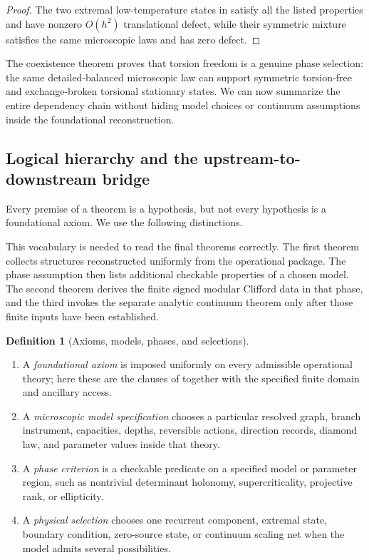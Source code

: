 \documentclass[11pt]{article}
\theoremstyle{definition}
\newtheorem{definition}[theorem]{Definition}
\theoremstyle{remark}
\begin{document}
\begin{proof}
The two extremal low-temperature states in
 satisfy all the listed properties and have
nonzero $O(h^2)$ translational defect, while their symmetric mixture satisfies
the same microscopic laws and has zero defect.
\end{proof}

The coexistence theorem proves that torsion freedom is a genuine phase selection:
the same detailed-balanced microscopic law can support symmetric torsion-free and
exchange-broken torsional stationary states.  We can now summarize the entire
dependency chain without hiding model choices or continuum assumptions inside the
foundational reconstruction.

\subsection{Logical hierarchy and the upstream-to-downstream bridge}
\label{subsec:logical-hierarchy}

Every premise of a theorem is a hypothesis, but not every hypothesis is a
foundational axiom.  We use the following distinctions.

This vocabulary is needed to read the final theorems correctly.  The first theorem
collects structures reconstructed uniformly from the operational package.  The
phase assumption then lists additional checkable properties of a chosen model.
The second theorem derives the finite signed modular Clifford data in that phase,
and the third invokes the separate analytic continuum theorem only after those
finite inputs have been established.

\begin{definition}[Axioms, models, phases, and selections]
\label{def:logical-roles}
\begin{enumerate}[label=\textup{(\roman*)},leftmargin=2.4em]
\item A \emph{foundational axiom} is imposed uniformly on every admissible
      operational theory; here these are the clauses of
       together with the specified finite
      domain and ancillary access.
\item A \emph{microscopic model specification} chooses a particular resolved
      graph, branch instrument, capacities, depths, reversible actions,
      direction records, diamond law, and parameter values inside that theory.
\item A \emph{phase criterion} is a checkable predicate on a specified model or
      parameter region, such as nontrivial determinant holonomy,
      supercriticality, projective rank, or ellipticity.
\item A \emph{physical selection} chooses one recurrent component, extremal
      state, boundary condition, zero-source state, or continuum scaling net
      when the model admits several possibilities.
\end{enumerate}
\end{definition}
\end{document}
